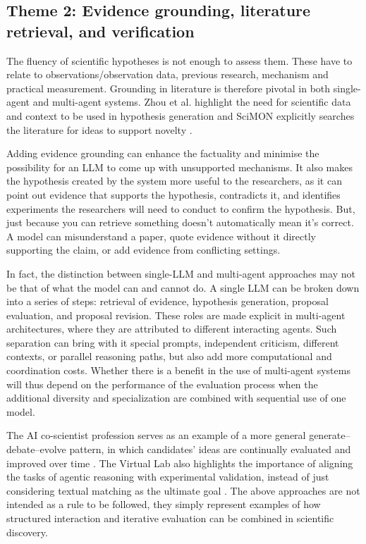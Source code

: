 \documentclass[acmsmall,screen,review]{acmart}
\begin{document}
\subsection{Theme 2: Evidence grounding, literature retrieval, and verification}
\label{subsec:evidence-grounding}

The fluency of scientific hypotheses is not enough to assess them. These have to relate to observations/observation data, previous research, mechanism and practical measurement. Grounding in literature is therefore pivotal in both single-agent and multi-agent systems. Zhou et al. highlight the need for scientific data and context to be used in hypothesis generation \cite{zhou2024hypothesis} and SciMON explicitly searches the literature for ideas to support novelty \cite{wang2024scimon}.

Adding evidence grounding can enhance the factuality and minimise the possibility for an LLM to come up with unsupported mechanisms. It also makes the hypothesis created by the system more useful to the researchers, as it can point out evidence that supports the hypothesis, contradicts it, and identifies experiments the researchers will need to conduct to confirm the hypothesis. But, just because you can retrieve something doesn't automatically mean it's correct. A model can misunderstand a paper, quote evidence without it directly supporting the claim, or add evidence from conflicting settings.

In fact, the distinction between single-LLM and multi-agent approaches may not be that of what the model can and cannot do. A single LLM can be broken down into a series of steps: retrieval of evidence, hypothesis generation, proposal evaluation, and proposal revision. These roles are made explicit in multi-agent architectures, where they are attributed to different interacting agents. Such separation can bring with it special prompts, independent criticism, different contexts, or parallel reasoning paths, but also add more computational and coordination costs. Whether there is a benefit in the use of multi-agent systems will thus depend on the performance of the evaluation process when the additional diversity and specialization are combined with sequential use of one model.

The AI co-scientist profession serves as an example of a more general generate--debate--evolve pattern, in which candidates' ideas are continually evaluated and improved over time \cite{gottweis2025towards}. The Virtual Lab also highlights the importance of aligning the tasks of agentic reasoning with experimental validation, instead of just considering textual matching as the ultimate goal \cite{virtuallab2024}. The above approaches are not intended as a rule to be followed, they simply represent examples of how structured interaction and iterative evaluation can be combined in scientific discovery.
\end{document}
